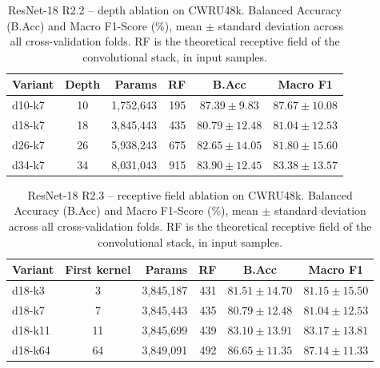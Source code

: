 \begin{table}[ht]
\centering
\caption{ResNet-18 R2.2 -- depth ablation on CWRU48k. Balanced Accuracy (B.Acc) and Macro F1-Score (\%), mean $\pm$ standard deviation across all cross-validation folds. RF is the theoretical receptive field of the convolutional stack, in input samples.}
\label{tab:ablation_resnet18_depth_cwru48k}
\begin{tabular}{@{}l c r r c c@{}}
\toprule
\textbf{Variant} & \textbf{Depth} & \textbf{Params} & \textbf{RF} & \textbf{B.Acc} & \textbf{Macro F1} \\ \midrule
d10-k7 & 10 & 1,752,643 & 195 & $87.39 \pm 9.83$ & $87.67 \pm 10.08$ \\
d18-k7 & 18 & 3,845,443 & 435 & $80.79 \pm 12.48$ & $81.04 \pm 12.53$ \\
d26-k7 & 26 & 5,938,243 & 675 & $82.65 \pm 14.05$ & $81.80 \pm 15.60$ \\
d34-k7 & 34 & 8,031,043 & 915 & $83.90 \pm 12.45$ & $83.38 \pm 13.57$ \\
\bottomrule
\end{tabular}
\end{table}

\begin{table}[ht]
\centering
\caption{ResNet-18 R2.3 -- receptive field ablation on CWRU48k. Balanced Accuracy (B.Acc) and Macro F1-Score (\%), mean $\pm$ standard deviation across all cross-validation folds. RF is the theoretical receptive field of the convolutional stack, in input samples.}
\label{tab:ablation_resnet18_kernel_cwru48k}
\begin{tabular}{@{}l c r r c c@{}}
\toprule
\textbf{Variant} & \textbf{First kernel} & \textbf{Params} & \textbf{RF} & \textbf{B.Acc} & \textbf{Macro F1} \\ \midrule
d18-k3 & 3 & 3,845,187 & 431 & $81.51 \pm 14.70$ & $81.15 \pm 15.50$ \\
d18-k7 & 7 & 3,845,443 & 435 & $80.79 \pm 12.48$ & $81.04 \pm 12.53$ \\
d18-k11 & 11 & 3,845,699 & 439 & $83.10 \pm 13.91$ & $83.17 \pm 13.81$ \\
d18-k64 & 64 & 3,849,091 & 492 & $86.65 \pm 11.35$ & $87.14 \pm 11.33$ \\
\bottomrule
\end{tabular}
\end{table}
